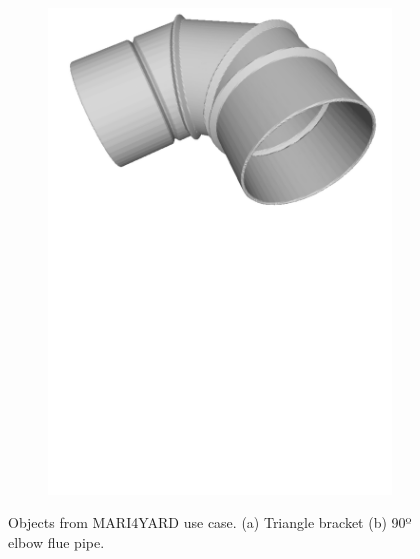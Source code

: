 \begin{figure}[h!]
{\begin{tcolorbox}
\begin{subfigure}[c]{.45\textwidth}
          \includegraphics[trim={0cm 16cm 0cm 0cm},clip,width=1\linewidth,angle=0]{Cap5/Figuras/objects/90_elbow_flue_pipe.pdf}
          \caption{}
          \label{fig:90_elbow_flue_pipe}
      \end{subfigure}
     \end{tcolorbox}
     \caption{Objects from MARI4YARD use case. (a) Triangle bracket (b) 90º elbow flue pipe.}
     \label{fig:obj_mari4yard}
   }%
 \end{figure}

